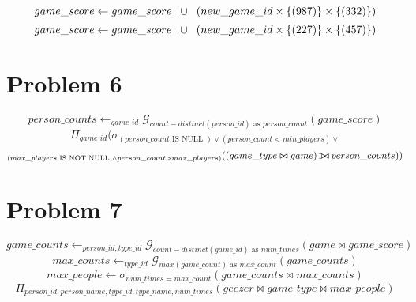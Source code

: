 \documentclass{article}
\def\ojoin{\setbox0=\hbox{$\bowtie$}%
    \rule[-.02ex]{.25em}{.4pt}\llap{\rule[\ht0]{.25em}{.4pt}}}
\def\leftouterjoin{\mathbin{\ojoin\mkern-5.8mu\bowtie}}
\begin{document}
\[ game\_score \leftarrow game\_score \hspace{2mm} \cup \hspace{2mm}
        (new\_game\_id \times \{(987)\} \times \{(332)\}) \]
\[ game\_score \leftarrow game\_score \hspace{2mm} \cup \hspace{2mm}
        (new\_game\_id \times \{(227)\} \times \{(457)\}) \]

\section*{Problem 6}
\[ person\_counts \leftarrow
    _{game\_id} \mathcal{G}_{
    count-distinct(person\_id) \text{ as } person\_count} (game\_score) \]
\[ \Pi_{game\_id}
    (\sigma_{(person\_count \text{ IS NULL }) \vee
    (person\_count < min\_players) \vee} \]
\[
    _{(max\_players \text{ IS NOT NULL } \wedge person\_count > max\_players)}
    ((game\_type \bowtie game) \leftouterjoin person\_counts)) \]
\section*{Problem 7}
\[ game\_counts \leftarrow _{person\_id, type\_id}
    \mathcal{G}_{
    count-distinct(game\_id) \text{ as } num\_times}
    (game \bowtie game\_score) \]
\[ max\_counts \leftarrow _{type\_id}
    \mathcal{G}_{max(game\_count) \text{ as } max\_count}
    (game\_counts) \]
\[ max\_people \leftarrow \sigma_{num\_times = max\_count}
        (game\_counts \bowtie max\_counts) \]
\[ \Pi_{person\_id, person\_name, type\_id, type\_name, num\_times}
    (geezer \bowtie game\_type \bowtie max\_people) \]
\end{document}
